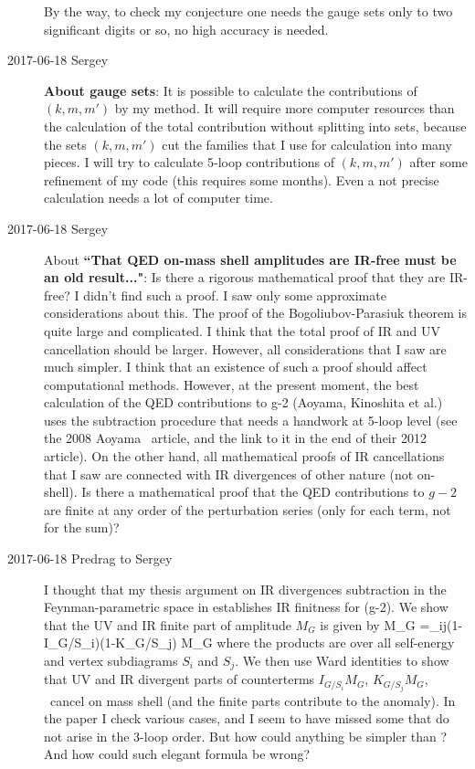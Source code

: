 \begin{description}
By the way, to check my conjecture one needs the gauge sets only to two
significant digits or so, no high accuracy is needed.

\item[2017-06-18 Sergey]
\textbf{About gauge sets}:
It is possible to calculate the contributions of $(k,m,m')$ by my
method. It will require more computer resources than the calculation of
the total contribution without splitting into sets, because the sets
$(k,m,m')$ cut the families that I use for calculation into many pieces.
I will try to calculate 5-loop contributions of $(k,m,m')$ after
some refinement of my code (this requires some months). Even a not
precise calculation needs a lot of computer time.

\item[2017-06-18 Sergey] About
\textbf{``That QED on-mass shell amplitudes are IR-free must be an old result..."}:
Is there a rigorous mathematical proof that they are IR-free? I didn't
find such a proof. I saw only some approximate considerations about this.
The proof of the Bogoliubov-Parasiuk theorem is quite large and
complicated. I think that the total proof of IR and UV cancellation
should be larger. However, all considerations that I saw are much
simpler. I think that an existence of such a proof should affect
computational methods. However, at the present moment, the best
calculation of the QED contributions to g-2 (Aoyama, Kinoshita et al.)
uses the subtraction procedure that needs a handwork at 5-loop level (see
the 2008 Aoyama \etal\ article, and the link to it in
the end of their 2012 article). On the other hand, all
mathematical proofs of IR cancellations that I saw are connected with IR
divergences of other nature (not on-shell). Is there a mathematical proof
that the QED contributions to $g-2$ are finite at any order of the
perturbation series (only for each term, not for the sum)?

\item[2017-06-18 Predrag to Sergey]
I thought that my thesis argument on IR divergences subtraction in the
Feynman-parametric space in  establishes IR finitness for
(g-2).
We show that the UV and IR finite part of amplitude $M_G$ is given by
\beq
\Delta M_G =\prod_{ij}(1-I_{G/S_i})(1-K_{G/S_j}) M_G
where the products are over all self-energy and vertex subdiagrams $S_i$ and
$S_j$. We then use Ward identities to show that UV and IR divergent parts
of counterterms $I_{G/S_i} M_G$, $K_{G/S_j} M_G$, \etc\ cancel on mass
shell (and the finite parts contribute to the anomaly). In the paper I
check various cases, and I seem to have missed some that do not arise in
the 3-loop order. But how could anything be simpler than
? And how could such elegant formula be wrong?


\end{description}
